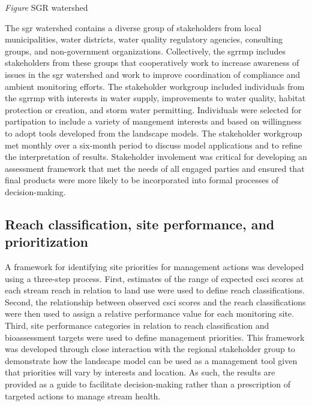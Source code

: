\documentclass[]{article}
\begin{document}
\emph{Figure} SGR watershed

The \ac{sgr} watershed contains a diverse group of stakeholders from
local municipalities, water districts, water quality regulatory
agencies, consulting groups, and non-government organizations.
Collectively, the \ac{sgrrmp} includes stakeholders from these groups
that cooperatively work to increase awareness of issues in the \ac{sgr}
watershed and work to improve coordination of compliance and ambient
monitoring efforts. The stakeholder workgroup included individuals from
the \ac{sgrrmp} with interests in water supply, improvements to water
quality, habitat protection or creation, and storm water permitting.
Individuals were selected for partipation to include a variety of
mangement interests and based on willingness to adopt tools developed
from the landscape models. The stakeholder workgroup met monthly over a
six-month period to discuss model applications and to refine the
interpretation of results. Stakeholder involement was critical for
developing an assessment framework that met the needs of all engaged
parties and ensured that final products were more likely to be
incorporated into formal processes of decision-making.

\subsection{Reach classification, site performance, and
prioritization}\label{reach-classification-site-performance-and-prioritization}

A framework for identifying site priorities for management actions was
developed using a three-step process. First, estimates of the range of
expected \ac{csci} scores at each stream reach in relation to land use
were used to define reach classifications. Second, the relationship
between observed \ac{csci} scores and the reach classifications were
then used to assign a relative performance value for each monitoring
site. Third, site performance categories in relation to reach
classification and bioassessment targets were used to define management
priorities. This framework was developed through close interaction with
the regional stakeholder group to demonstrate how the landscape model
can be used as a management tool given that priorities will vary by
interests and location. As such, the results are provided as a guide to
facilitate decision-making rather than a prescription of targeted
actions to manage stream health.
\end{document}
